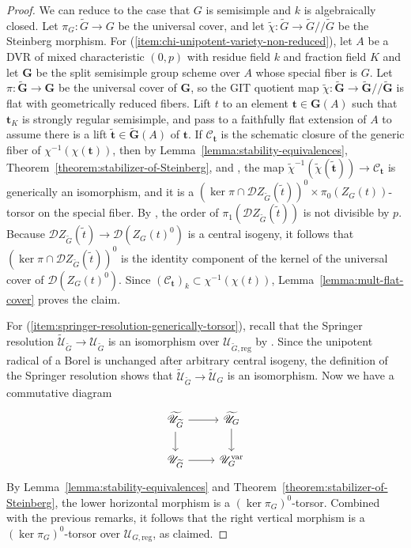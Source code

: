 \documentclass[11pt,reqno]{amsart}
\theoremstyle{definition}
\renewcommand{\rm}{\mathrm}
\newcommand{\bG}{{\mathbf G}}
\newcommand{\bt}{{\mathbf t}}
\newcommand{\sC}{{\mathscr C}}
\newcommand{\sD}{{\mathscr D}}
\newcommand{\sU}{{\mathscr U}}
\begin{document}
\begin{proof}
We can reduce to the case that $G$ is semisimple and $k$ is algebraically closed. Let $\pi_G: \widetilde{G} \to G$ be the universal cover, and let $\widetilde{\chi}\colon \widetilde{G} \to \widetilde{G}/\!/\widetilde{G}$ be the Steinberg morphism. For (\ref{item:chi-unipotent-variety-non-reduced}), let $A$ be a DVR of mixed characteristic $(0, p)$ with residue field $k$ and fraction field $K$ and let $\bG$ be the split semisimple group scheme over $A$ whose special fiber is $G$. Let $\pi: \widetilde{\bG} \to \bG$ be the universal cover of $\bG$, so the GIT quotient map $\widetilde{\chi}\colon \widetilde{\bG} \to \widetilde{\bG}/\!/\widetilde{\bG}$ is flat with geometrically reduced fibers. Lift $t$ to an element $\bt \in \bG(A)$ such that $\bt_K$ is strongly regular semisimple, and pass to a faithfully flat extension of $A$ to assume there is a lift $\widetilde{\bt} \in \widetilde{\bG}(A)$ of $\bt$. If $\sC_\bt$ is the schematic closure of the generic fiber of $\chi^{-1}(\chi(\bt))$, then by Lemma~\ref{lemma:stability-equivalences}, Theorem~\ref{theorem:stabilizer-of-Steinberg}, and \cite[Theorem 4.1(1)]{Lee-adjoint}, the map $\widetilde{\chi}^{-1}(\widetilde{\chi}(\widetilde{\bt})) \to \sC_\bt$ is generically an isomorphism, and it is a $(\ker \pi \cap \sD Z_{\widetilde{G}}(\widetilde{t}))^0 \times \pi_0(Z_G(t))$-torsor on the special fiber. By \cite[Corollary 3.2(1)]{Integral-Springer}, the order of $\pi_1(\sD Z_{\widetilde{G}}(\widetilde{t}))$ is not divisible by $p$. Because $\sD Z_{\widetilde{G}}(\widetilde{t}) \to \sD(Z_G(t)^0)$ is a central isogeny, it follows that $(\ker \pi \cap \sD Z_{\widetilde{G}}(\widetilde{t}))^0$ is the identity component of the kernel of the universal cover of $\sD(Z_G(t)^0)$. Since $(\sC_\bt)_k \subset \chi^{-1}(\chi(t))$, Lemma~\ref{lemma:mult-flat-cover} proves the claim. 

For (\ref{item:springer-resolution-generically-torsor}), recall that the Springer resolution $\widetilde{\sU}_{\widetilde{G}} \to \sU_{\widetilde{G}}$ is an isomorphism over $\sU_{\widetilde{G}, \rm{reg}}$ by \cite[\S 6]{Steinberg-Desingularization}. Since the unipotent radical of a Borel is unchanged after arbitrary central isogeny, the definition of the Springer resolution shows that $\widetilde{\sU}_{\widetilde{G}} \to \widetilde{\sU}_G$ is an isomorphism. Now we have a commutative diagram
\[
\begin{tikzcd}
\widetilde{\sU}_{\widetilde{G}} \arrow[r] \arrow[d]
    &\widetilde{\sU}_G \arrow[d] \\
\sU_{\widetilde{G}} \arrow[r]
    &\sU_G^{\rm{var}}
\end{tikzcd}
\]
By Lemma~\ref{lemma:stability-equivalences} and Theorem~\ref{theorem:stabilizer-of-Steinberg}, the lower horizontal morphism is a $(\ker \pi_G)^0$-torsor. Combined with the previous remarks, it follows that the right vertical morphism is a $(\ker \pi_G)^0$-torsor over $\sU_{G, \rm{reg}}$, as claimed.
\end{proof}
\end{document}
